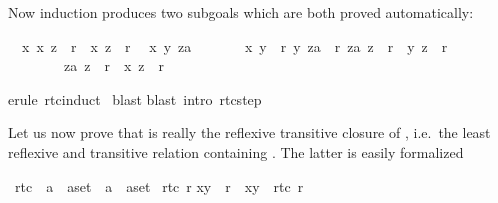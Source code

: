 \begin{isabellebody}
\begin{isamarkuptxt}
Now induction produces two subgoals which are both proved automatically:
\begin{isabelle}
\ {}{\isachardot}\ {\isasymAnd}x{\isachardot}\ {\isacharparenleft}x{\isacharcomma}\ z{\isacharparenright}\ {\isasymin}\ r{\isacharasterisk}\ {\isasymlongrightarrow}\ {\isacharparenleft}x{\isacharcomma}\ z{\isacharparenright}\ {\isasymin}\ r{\isacharasterisk}\isanewline
\ {}{\isachardot}\ {\isasymAnd}x\ y\ za{\isachardot}\isanewline
\ \ \ \ \ \ \ {\isasymlbrakk}{\isacharparenleft}x{\isacharcomma}\ y{\isacharparenright}\ {\isasymin}\ r{\isacharsemicolon}\ {\isacharparenleft}y{\isacharcomma}\ za{\isacharparenright}\ {\isasymin}\ r{\isacharasterisk}{\isacharsemicolon}\ {\isacharparenleft}za{\isacharcomma}\ z{\isacharparenright}\ {\isasymin}\ r{\isacharasterisk}\ {\isasymlongrightarrow}\ {\isacharparenleft}y{\isacharcomma}\ z{\isacharparenright}\ {\isasymin}\ r{\isacharasterisk}{\isasymrbrakk}\isanewline
\ \ \ \ \ \ \ {\isasymLongrightarrow}\ {\isacharparenleft}za{\isacharcomma}\ z{\isacharparenright}\ {\isasymin}\ r{\isacharasterisk}\ {\isasymlongrightarrow}\ {\isacharparenleft}x{\isacharcomma}\ z{\isacharparenright}\ {\isasymin}\ r{\isacharasterisk}
\end{isabelle}%
\end{isamarkuptxt}%
erule\ rtc{\isachardot}induct{\isacharparenright}\isanewline
\ blast{\isacharparenright}\isanewline
{}blast\ intro{\isacharcolon}\ rtc{\isacharunderscore}step{\isacharparenright}\isanewline
{}%
\begin{isamarkuptext}%
Let us now prove that  is really the reflexive transitive closure
of , i.e.\ the least reflexive and transitive
relation containing . The latter is easily formalized%
\end{isamarkuptext}%
\ rtc{}\ {\isacharcolon}{\isacharcolon}\ {\isachardoublequote}{\isacharparenleft}{\isacharprime}a\ {\isasymtimes}\ {\isacharprime}a{\isacharparenright}set\ {\isasymRightarrow}\ {\isacharparenleft}{\isacharprime}a\ {\isasymtimes}\ {\isacharprime}a{\isacharparenright}set{\isachardoublequote}\isanewline
{}\ {\isachardoublequote}rtc{}\ r{\isachardoublequote}\isanewline
{}\isanewline
{\isachardoublequote}{\isacharparenleft}x{\isacharcomma}y{\isacharparenright}\ {\isasymin}\ r\ {\isasymLongrightarrow}\ {\isacharparenleft}x{\isacharcomma}y{\isacharparenright}\ {\isasymin}\ rtc{}\ r{\isachardoublequote}\isanewline

\end{isabellebody}
